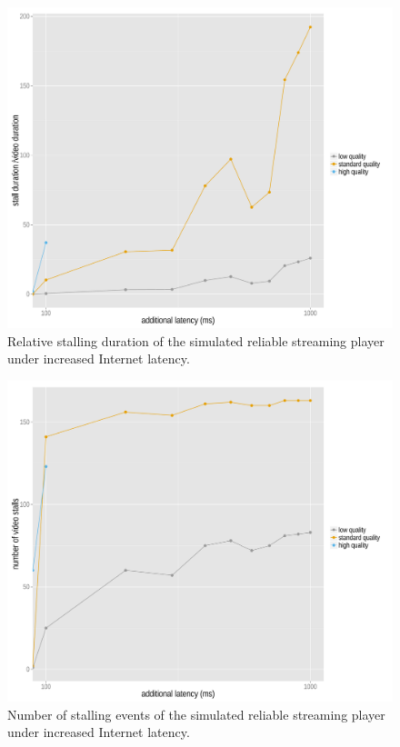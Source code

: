 \begin{figure}[htb]
	\centering
	\includegraphics[width=1.0\textwidth]{images/R-ltesim-latencyseries-stallduration.pdf}
	\caption{Relative stalling duration of the simulated reliable streaming player under increased Internet latency.}
\label{c6:fig:ltesim-latencyseries-stallduration}
\end{figure}

\begin{figure}[htb]
	\centering
	\includegraphics[width=1.0\textwidth]{images/R-ltesim-latencyseries-numstalls.pdf}
	\caption{Number of stalling events of the simulated reliable streaming player under increased Internet latency.}
\label{c6:fig:ltesim-latencyseries-numstalls}
\end{figure}



